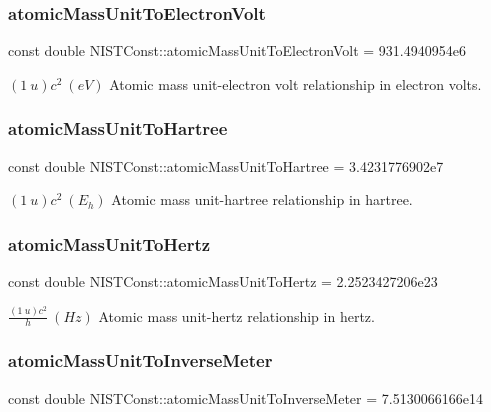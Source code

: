 \subsubsection{\texorpdfstring{atomic\+Mass\+Unit\+To\+Electron\+Volt}{atomicMassUnitToElectronVolt}}
{\footnotesize\ttfamily const double N\+I\+S\+T\+Const\+::atomic\+Mass\+Unit\+To\+Electron\+Volt = 931.\+4940954e6}

$(1\ u)c^2 \ (eV)$ Atomic mass unit-\/electron volt relationship in electron volts. \mbox{\label{group___atomic_mass_unit_ga8a6b352e1a13d0cbbc0f36f650e2c682}} 
\subsubsection{\texorpdfstring{atomic\+Mass\+Unit\+To\+Hartree}{atomicMassUnitToHartree}}
{\footnotesize\ttfamily const double N\+I\+S\+T\+Const\+::atomic\+Mass\+Unit\+To\+Hartree = 3.\+4231776902e7}

$(1\ u)c^2 \ (E_h)$ Atomic mass unit-\/hartree relationship in hartree. \mbox{\label{group___atomic_mass_unit_gad284f1982f0182e1e4a90e0bff793af9}} 
\subsubsection{\texorpdfstring{atomic\+Mass\+Unit\+To\+Hertz}{atomicMassUnitToHertz}}
{\footnotesize\ttfamily const double N\+I\+S\+T\+Const\+::atomic\+Mass\+Unit\+To\+Hertz = 2.\+2523427206e23}

$\frac{(1\ u)c^2}{h} \ (Hz)$ Atomic mass unit-\/hertz relationship in hertz. \mbox{\label{group___atomic_mass_unit_gae1f5517810a5df9365d26887c04ada40}} 
\subsubsection{\texorpdfstring{atomic\+Mass\+Unit\+To\+Inverse\+Meter}{atomicMassUnitToInverseMeter}}
{\footnotesize\ttfamily const double N\+I\+S\+T\+Const\+::atomic\+Mass\+Unit\+To\+Inverse\+Meter = 7.\+5130066166e14}

